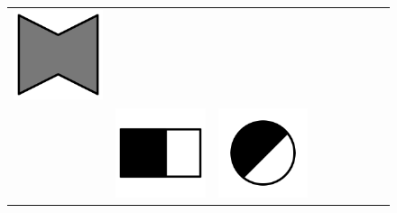 \documentclass[doc]{apa6}
\newcommand{\stimulusscale}{.1}
\begin{document}
\begin{figure}[p]
\begin{center}
\begin{tabular}{c|cccccccc}
\includegraphics[scale=\stimulusscale]{./set12stim55.png}\\[6pt]
 \raisebox{.75cm}{75}  &
\includegraphics[scale=\stimulusscale]{./set7stim75.png} &
\includegraphics[scale=\stimulusscale]{./set8stim75.png} &

\end{tabular}
\end{center}
\end{figure}
\end{document}
